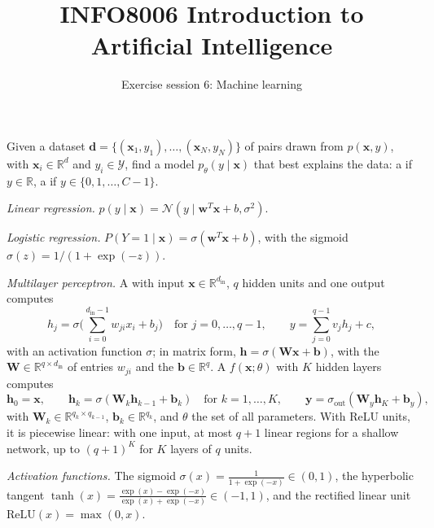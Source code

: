 \documentclass[11pt, a4paper]{exam}
\title{\bfseries INFO8006 Introduction to Artificial Intelligence}
\author{Exercise session 6: Machine learning}
\date{}
\newcommand{\ReLU}{\mathrm{ReLU}}
\begin{document}
\maketitle

\begin{recap}
    Given a dataset $\mathbf{d} = \{(\mathbf{x}_1, y_1), \ldots, (\mathbf{x}_N, y_N)\}$ of pairs drawn from $p(\mathbf{x}, y)$, with $\mathbf{x}_i \in \mathbb{R}^d$ and $y_i \in \mathcal{Y}$, find a model $p_\theta(y \mid \mathbf{x})$ that best explains the data: a  if $y \in \mathbb{R}$, a  if $y \in \{0, 1, \ldots, C-1\}$.

    \emph{Linear regression.} $p(y \mid \mathbf{x}) = \mathcal{N}(y \mid \mathbf{w}^T \mathbf{x} + b, \sigma^2)$.

    \emph{Logistic regression.} $P(Y = 1 \mid \mathbf{x}) = \sigma(\mathbf{w}^T \mathbf{x} + b)$, with the sigmoid $\sigma(z) = 1 / (1 + \exp(-z))$.

    \emph{Multilayer perceptron.} A  with input $\mathbf{x} \in \mathbb{R}^{d_{\text{in}}}$, $q$ hidden units and one output computes
    \[
        h_j = \sigma\Big(\sum_{i=0}^{d_{\text{in}}-1} w_{ji} x_i + b_j\Big) \quad \text{for } j = 0, \ldots, q-1, \qquad y = \sum_{j=0}^{q-1} v_j h_j + c,
    \]
    with an activation function $\sigma$; in matrix form, $\mathbf{h} = \sigma(\mathbf{W} \mathbf{x} + \mathbf{b})$, with the  $\mathbf{W} \in \mathbb{R}^{q \times d_{\text{in}}}$ of entries $w_{ji}$ and the  $\mathbf{b} \in \mathbb{R}^q$. A  $f(\mathbf{x}; \theta)$ with $K$ hidden layers computes
    \[
        \mathbf{h}_0 = \mathbf{x}, \qquad \mathbf{h}_k = \sigma(\mathbf{W}_k \mathbf{h}_{k-1} + \mathbf{b}_k) \quad \text{for } k = 1, \ldots, K, \qquad \mathbf{y} = \sigma_\text{out}(\mathbf{W}_y \mathbf{h}_K + \mathbf{b}_y),
    \]
    with $\mathbf{W}_k \in \mathbb{R}^{q_k \times q_{k-1}}$, $\mathbf{b}_k \in \mathbb{R}^{q_k}$, and $\theta$ the set of all parameters. With ReLU units, it is piecewise linear: with one input, at most $q + 1$ linear regions for a shallow network, up to $(q + 1)^K$ for $K$ layers of $q$ units.

    \emph{Activation functions.} The sigmoid $\sigma(x) = \frac{1}{1 + \exp(-x)} \in (0, 1)$, the hyperbolic tangent $\tanh(x) = \frac{\exp(x) - \exp(-x)}{\exp(x) + \exp(-x)} \in (-1, 1)$, and the rectified linear unit $\ReLU(x) = \max(0, x)$.


\end{recap}
\end{document}
